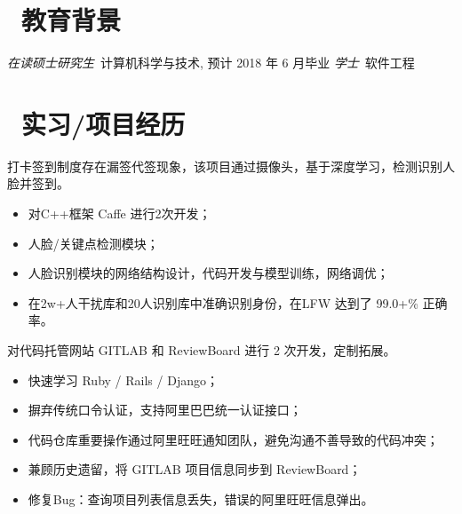 \documentclass{resume}
\begin{document}


 
\section{\faGraduationCap\  教育背景}
\textit{在读硕士研究生}\ 计算机科学与技术, 预计 2018 年 6 月毕业
\textit{学士}\ 软件工程

\section{\faUsers\ 实习/项目经历}

\begin{onehalfspacing}
打卡签到制度存在漏签代签现象，该项目通过摄像头，基于深度学习，检测识别人脸并签到。
\begin{itemize}
  \item 对C++框架 Caffe 进行2次开发；
  \item 人脸/关键点检测模块；
  \item 人脸识别模块的网络结构设计，代码开发与模型训练，网络调优；
  \item 在2w+人干扰库和20人识别库中准确识别身份，在LFW 达到了 99.0+\% 正确率。
\end{itemize}
\end{onehalfspacing}

对代码托管网站 GITLAB 和 ReviewBoard 进行 2 次开发，定制拓展。
\begin{itemize}
  \item 快速学习 Ruby / Rails / Django；
  \item 摒弃传统口令认证，支持阿里巴巴统一认证接口；
  \item 代码仓库重要操作通过阿里旺旺通知团队，避免沟通不善导致的代码冲突；
  \item 兼顾历史遗留，将 GITLAB 项目信息同步到 ReviewBoard；
  \item 修复Bug：查询项目列表信息丢失，错误的阿里旺旺信息弹出。
\end{itemize}
\end{document}

